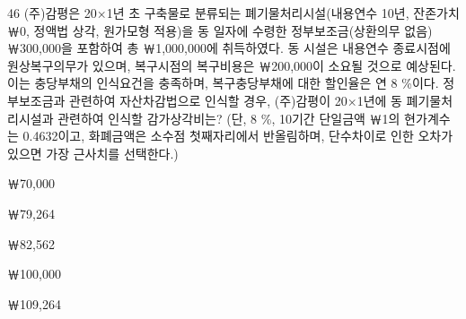 \begin{question}{46}
(주)감평은 20×1년 초 구축물로 분류되는 폐기물처리시설(내용연수 10년, 잔존가치 ￦0, 정액법 상각, 원가모형 적용)을 동 일자에 수령한 정부보조금(상환의무 없음) ￦300,000을 포함하여 총 ￦1,000,000에 취득하였다. 동 시설은 내용연수 종료시점에 원상복구의무가 있으며, 복구시점의 복구비용은 ￦200,000이 소요될 것으로 예상된다. 이는 충당부채의 인식요건을 충족하며, 복구충당부채에 대한 할인율은 연 8 \%이다. 정부보조금과 관련하여 자산차감법으로 인식할 경우, (주)감평이 20×1년에 동 폐기물처리시설과 관련하여 인식할 감가상각비는? (단, 8 \%, 10기간 단일금액 ￦1의 현가계수는 0.4632이고, 화폐금액은 소수점 첫째자리에서 반올림하며, 단수차이로 인한 오차가 있으면 가장 근사치를 선택한다.) \par
\begin{choices}
  \item ￦70,000
  \item ￦79,264
  \item ￦82,562
  \item ￦100,000
  \item ￦109,264
\end{choices}
\end{question}
